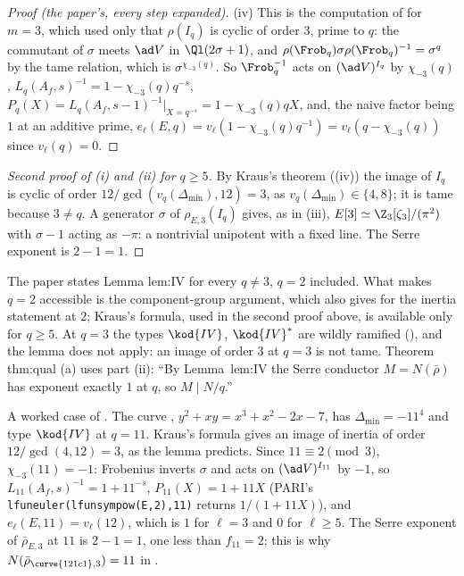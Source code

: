 \begin{proof}[Proof (the paper's, every step expanded)]
(iv) This is the computation of  for $m=3$, which used only that $\rho(I_q)$ is cyclic of order $3$, prime to $q$: the
commutant of $\sigma$ meets $\ad V$ in $\Ql(2\sigma+1)$, and $\rho(\Frob_q)\sigma\rho(\Frob_q)^{-1}=\sigma^q$ by the tame relation, which is $\sigma^{\chi_{-3}(q)}$. So $\Frob_q^{-1}$
acts on $(\ad V)^{I_q}$ by $\chi_{-3}(q)$, $L_q(A_f,s)^{-1}=1-\chi_{-3}(q)q^{-s}$, $P_q(X)=L_q(A_f,s-1)^{-1}|_{X=q^{-s}}=1-\chi_{-3}(q)qX$, and, the naive factor being $1$ at an
additive prime, $e_\ell(E,q)=v_\ell(1-\chi_{-3}(q)q^{-1})=v_\ell(q-\chi_{-3}(q))$ since $v_\ell(q)=0$.
\end{proof}

\begin{proof}[Second proof of (i) and (ii) for $q\ge5$]
By Kraus's theorem ((iv)) the image of $I_q$ is cyclic of order $12/\gcd(v_q(\Delta_{\min}),12)=3$, as $v_q(\Delta_{\min})\in\{4,8\}$; it is
tame because $3\ne q$. A generator $\sigma$ of $\rho_{E,3}(I_q)$ gives, as in (iii), $E[3]\simeq\Z_3[\zeta_3]/(\pi^2)$ with $\sigma-1$ acting as $-\pi$: a nontrivial unipotent
with a fixed line. The Serre exponent is $2-1=1$.
\end{proof}

\begin{paperlink}
The paper states Lemma lem:IV for every $q\ne3$, $q=2$ included. What makes $q=2$ accessible is the component-group argument,
which  also gives for the inertia statement at $2$; Kraus's formula, used in the second proof above, is available only for $q\ge5$. At $q=3$ the types $\kod{IV}$, $\kod{IV}^*$ are
wildly ramified (), and the lemma does not apply: an image of order $3$ at $q=3$ is not tame. Theorem thm:qual (a) uses
part (ii): ``By Lemma~lem:IV the Serre conductor $M=N(\bar\rho)$ has exponent exactly $1$ at $q$, so $M\mid N/q$.''
\end{paperlink}

A worked case of . The curve , $y^2+xy=x^3+x^2-2x-7$, has $\Delta_{\min}=-11^4$ and type $\kod{IV}$ at $q=11$. Kraus's formula gives an
image of inertia of order $12/\gcd(4,12)=3$, as the lemma predicts. Since $11\equiv2\pmod3$, $\chi_{-3}(11)=-1$: Frobenius inverts $\sigma$ and acts on $(\ad V)^{I_{11}}$ by
$-1$, so $L_{11}(A_f,s)^{-1}=1+11^{-s}$, $P_{11}(X)=1+11X$ (PARI's \texttt{lfuneuler(lfunsympow(E,2),11)} returns $1/(1+11X)$), and $e_\ell(E,11)=v_\ell(12)$, which is
$1$ for $\ell=3$ and $0$ for $\ell\ge5$. The Serre exponent of $\bar\rho_{E,3}$ at $11$ is $2-1=1$, one less than $f_{11}=2$; this is why
$N(\bar\rho_{\curve{121c1},3})=11$ in .


